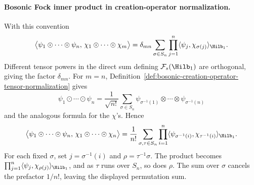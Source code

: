 \paragraph{Bosonic Fock inner product in creation-operator normalization.}
With this convention
\begin{equation}
  \bigl\langle
  \psi_1\odot\cdots\odot\psi_n,\,
  \chi_1\odot\cdots\odot\chi_m
  \bigr\rangle
  =
  \delta_{mn}
  \sum_{\sigma\in S_n}
  \prod_{j=1}^n
  \langle\psi_j,\chi_{\sigma(j)}\rangle_{\Hilb_1}.
  \label{eq:bosonic-fock-odot-inner-product}
\end{equation}
Different tensor powers in the direct sum defining
\(\mathcal F_s(\Hilb_1)\) are orthogonal, giving the factor \(\delta_{mn}\).
For \(m=n\), Definition~\ref{def:bosonic-creation-operator-tensor-normalization}
gives
\[
  \psi_1\odot\cdots\odot\psi_n
  =
  \frac1{\sqrt{n!}}\sum_{\sigma\in S_n}
  \psi_{\sigma^{-1}(1)}\otimes\cdots\otimes\psi_{\sigma^{-1}(n)}
\]
and the analogous formula for the \(\chi\)'s.  Hence
\[
  \bigl\langle
  \psi_1\odot\cdots\odot\psi_n,\,
  \chi_1\odot\cdots\odot\chi_n
  \bigr\rangle
  =
  \frac1{n!}\sum_{\sigma,\tau\in S_n}
  \prod_{i=1}^n
  \langle\psi_{\sigma^{-1}(i)},\chi_{\tau^{-1}(i)}\rangle_{\Hilb_1}.
\]
For each fixed \(\sigma\), set \(j=\sigma^{-1}(i)\) and
\(\rho=\tau^{-1}\sigma\).  The product becomes
\(\prod_{j=1}^n\langle\psi_j,\chi_{\rho(j)}\rangle_{\Hilb_1}\), and as
\(\tau\) runs over \(S_n\), so does \(\rho\).  The sum over \(\sigma\) cancels
the prefactor \(1/n!\), leaving the displayed permutation sum.

